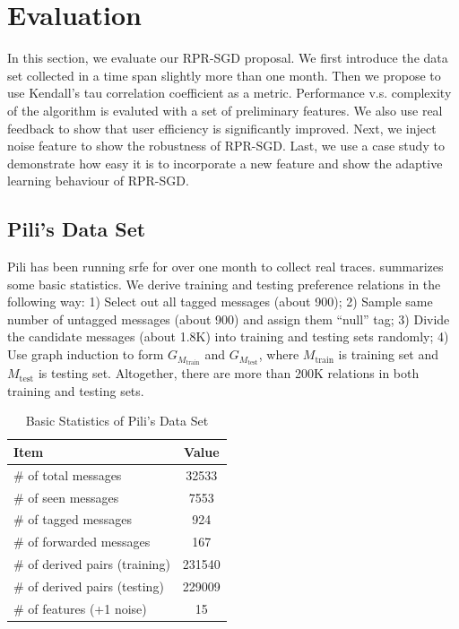 \documentclass{sig-alternate}
\begin{document}
\section{Evaluation}
\label{sec:Evaluation}

In this section, we evaluate our RPR-SGD proposal. 
We first introduce the data set collected in a time span slightly more than one month. 
Then we propose to use Kendall's tau correlation coefficient as a metric. 
Performance v.s. complexity of the algorithm is evaluted
with a set of preliminary features.  
We also use real feedback to show that user efficiency is significantly improved. 
Next, we inject noise feature to show the robustness of RPR-SGD. 
Last, we use a case study to demonstrate how easy it is to 
incorporate a new feature and show the adaptive learning behaviour of RPR-SGD. 

\subsection{Pili's Data Set}
\label{sec:Pili's Data Set}

Pili has been running \gls{srfe} for over one month to collect real traces. 
\rtbl{\ref{tbl:dataset}} summarizes some basic statistics. 
We derive training and testing preference relations in the following way:
1) Select out all tagged messages (about 900); 
2) Sample same number of untagged messages (about 900) and assign them ``null'' tag;
3) Divide the candidate messages (about 1.8K) into training and testing sets randomly;
4) Use graph induction to form $G_{M_{\text{train}}}$ and $G_{M_{\text{test}}}$, 
where ${M_{\text{train}}}$ is training set and ${M_{\text{test}}}$ is testing set. 
Altogether, there are more than 200K relations in both training and testing sets. 

\begin{table}[htb]
	\centering
	\caption{Basic Statistics of Pili's Data Set}
	\label{tbl:dataset}
	\begin{tabular}{l|c}
		\hline
		Item & Value \\
		\hline
		\# of total messages & 32533\\
		\# of seen messages & 7553\\
		\# of tagged messages & 924\\
		\# of forwarded messages & 167\\
		\# of derived pairs (training) & 231540\\
		\# of derived pairs (testing) & 229009\\
		\# of features (+1 noise) & 15\\
		\hline
	\end{tabular}
\end{table}
\end{document}
